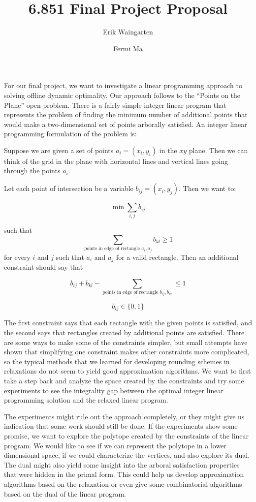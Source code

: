 \documentclass[11pt]{article}
\author{Erik Waingarten \and Fermi Ma}
\title{6.851 Final Project Proposal}
\begin{document}
         
\maketitle

For our final project, we want to investigate a linear programming approach to solving offline dynamic optimality. Our approach follows to the ``Points on the Plane'' open problem. There is a fairly simple integer linear program that represents the problem of finding the minimum number of additional points that would make a two-dimensional set of points arborally satisfied. An integer linear programming formulation of the problem is:

Suppose we are given a set of points $a_i = (x_i, y_i)$ in the $xy$ plane. Then we can think of the grid in the plane with horizontal lines and vertical lines going through the points $a_i$. 

Let each point of intersection be a variable $b_{ij} = (x_i, y_j)$. Then we want to:

\[ \min \sum_{i,j} b_{ij} \]

such that 
\[  \sum_{\text{points in edge of rectangle }a_i, a_j} b_{kl} \geq 1 \]
for every $i$ and $j$ such that $a_i$ and $a_j$ for a valid rectangle. Then an additional constraint should say that

\[ b_{ij} + b_{kl} - \sum_{\text{points in edge of rectangle }b_{ij}, b_{kl}} \leq 1 \] 

\[ b_{ij} \in \{ 0, 1 \} \]

The first constraint says that each rectangle with the given points is satisfied, and the second says that rectangles created by additional points are satisfied. There are some ways to make some of the constraints simpler, but small attempts have shown that simplifying one constraint makes other constraints more complicated, so the typical methods that we learned for developing rounding schemes in relaxations do not seem to yield good approximation algorithms. We want to first take a step back and analyze the space created by the constraints and try some experiments to see the integrality gap between the optimal integer linear programming solution and the relaxed linear program. 

The experiments might rule out the approach completely, or they might give us indication that some work should still be done. If the experiments show some promise, we want to explore the polytope created by the constraints of the linear program. We would like to see if we can represent the polytope in a lower dimensional space, if we could characterize the vertices, and also explore its dual. The dual might also yield some insight into the arboral satisfaction properties that were hidden in the primal form. This could help us develop approximation algorithms based on the relaxation or even give some combinatorial algorithms based on the dual of the linear program.  
\end{document}
